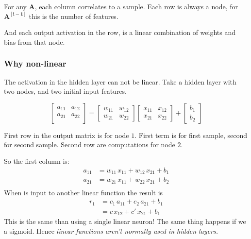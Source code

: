 For any $\mathbf{A}$, each column correlates to a sample. Each row is always a node, for $\mathbf{{A}^{[i-1]}}$ this is the number of features.

And each output activation in the row, is a linear combination of weights and bias from that node.

\subsubsection{Why non-linear}
The activation in the hidden layer can not be linear. Take a hidden layer with two nodes, and two initial input features.

\begin{equation*}
  \begin{bmatrix}
    a_{11} & a_{12}\\
    a_{21} & a_{22}\\
  \end{bmatrix}
  = 
  \begin{bmatrix}
    w_{11}& w_{12}\\
    w_{21}& w_{22}
  \end{bmatrix}
  \begin{bmatrix}
    x_{11} & x_{12}\\
    x_{21} & x_{22} 
  \end{bmatrix}
  + \begin{bmatrix}b_1\\ b_2\end{bmatrix}
\end{equation*}

First row in the output matrix is for node $1$. First term is for first sample, second for second sample. Second row are computations for node $2$.

So the first column is:
\begin{align*}
  a_{11} &= w_{11}\,x_{11} + w_{12}\,x_{21} + b_1\\
  a_{21} &= w_{21}\,x_{11} + w_{22}\,x_{21} + b_2\\
\end{align*}
When is input to another linear function the result is 
\begin{align*}
  r_1 &= c_1\,a_{11} + c_2\,a_{21} + b_1\\
  &= c\,x_{12} + c'\,x_{21} + b_1
\end{align*}
This is the same than using a single linear neuron! The same thing happens if we a sigmoid. Hence \textit{linear functions aren't normally used in hidden layers.}

